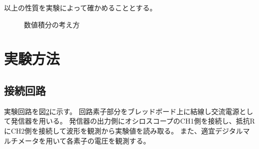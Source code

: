 \documentclass[11pt,a4paper,fleqn]{jsarticle}
\begin{document}
以上の性質を実験によって確かめることとする。
\begin{figure}[htbp]
 \centering
 \caption{数値積分の考え方}
 \label{fig:6}
\end{figure}
%
\section{実験方法}
\subsection{接続回路}
実験回路を図\ref{fig:3}に示す。
回路素子部分をブレッドボード上に結線し交流電源として発信器を用いる。
発信器の出力側にオシロスコープのCH1側を接続し、抵抗RにCH2側を接続して波形を観測から実験値を読み取る。
また、適宜デジタルマルチメータを用いて各素子の電圧を観測する。
\begin{figure}[h]
\label{fig:3}
\end{figure}
\end{document}
